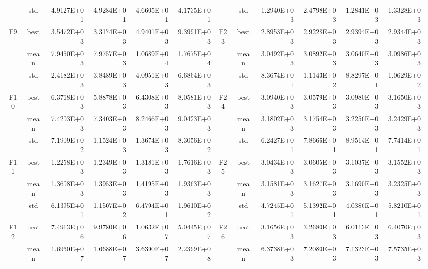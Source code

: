 \documentclass{wzuthesis}
\begin{document}
\begin{table}[htbp]
\begin{tabular}{rrrrrrccrrrr}
          & \multicolumn{1}{c}{std} & 4.9127E+01 & 4.9284E+01 & 4.6605E+01 & 4.1735E+01 &       & std   & 1.2940E+03 & 2.4798E+03 & 1.2841E+03 & 1.3328E+03 \\
    \multicolumn{1}{c}{\multirow{3}[0]{*}{F9}} & \multicolumn{1}{c}{best} & 3.5472E+03 & 3.3174E+03 & 4.9401E+03 & 9.3991E+03 & \multirow{3}[0]{*}{F23} & best  & 2.8953E+03 & 2.9228E+03 & 2.9394E+03 & 2.9344E+03 \\
          & \multicolumn{1}{c}{mean} & 7.9460E+03 & 7.9757E+03 & 1.0689E+04 & 1.7675E+04 &       & mean  & 3.0492E+03 & 3.0892E+03 & 3.0640E+03 & 3.0986E+03 \\
          & \multicolumn{1}{c}{std} & 2.4182E+03 & 3.8489E+03 & 4.0951E+03 & 6.6864E+03 &       & std   & 8.3674E+01 & 1.1143E+02 & 8.8297E+01 & 1.0629E+02 \\
    \multicolumn{1}{c}{\multirow{3}[0]{*}{F10}} & \multicolumn{1}{c}{best} & 6.3768E+03 & 5.8878E+03 & 6.4308E+03 & 8.0581E+03 & \multirow{3}[0]{*}{F24} & best  & 3.0940E+03 & 3.0579E+03 & 3.0980E+03 & 3.1650E+03 \\
          & \multicolumn{1}{c}{mean} & 7.4203E+03 & 7.3403E+03 & 8.2466E+03 & 9.0423E+03 &       & mean  & 3.1802E+03 & 3.1754E+03 & 3.2256E+03 & 3.2429E+03 \\
          & \multicolumn{1}{c}{std} & 7.1909E+02 & 1.1524E+03 & 1.3674E+03 & 8.3056E+02 &       & std   & 6.2427E+01 & 7.8666E+01 & 8.9514E+01 & 7.7414E+01 \\
    \multicolumn{1}{c}{\multirow{3}[0]{*}{F11}} & \multicolumn{1}{c}{best} & 1.2258E+03 & 1.2349E+03 & 1.3181E+03 & 1.7616E+03 & \multirow{3}[0]{*}{F25} & best  & 3.0434E+03 & 3.0605E+03 & 3.1037E+03 & 3.1552E+03 \\
          & \multicolumn{1}{c}{mean} & 1.3608E+03 & 1.3953E+03 & 1.4195E+03 & 1.9363E+03 &       & mean  & 3.1581E+03 & 3.1627E+03 & 3.1690E+03 & 3.2325E+03 \\
          & \multicolumn{1}{c}{std} & 6.1395E+01 & 1.1507E+02 & 6.4794E+01 & 1.9610E+02 &       & std   & 4.7245E+01 & 5.1392E+01 & 4.0386E+01 & 5.8210E+01 \\
    \multicolumn{1}{c}{\multirow{3}[0]{*}{F12}} & \multicolumn{1}{c}{best} & 7.4913E+06 & 9.9780E+06 & 1.0632E+07 & 5.0445E+07 & \multirow{3}[0]{*}{F26} & best  & 3.1656E+03 & 3.2680E+03 & 6.0113E+03 & 6.4070E+03 \\
          & \multicolumn{1}{c}{mean} & 1.6960E+07 & 1.6688E+07 & 3.6390E+07 & 2.2399E+08 &       & mean  & 6.3738E+03 & 7.2080E+03 & 7.1323E+03 & 7.5735E+03 \\

\end{tabular}
\end{table}
\end{document}
